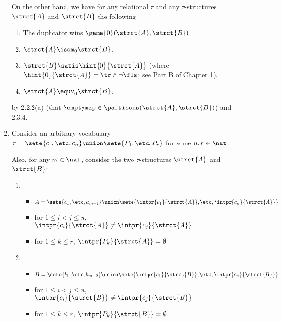 \begin{enumerate}[1.]
On the other hand, we have for any relational $\tau$ and any $\tau$-structures $\strct{A}$ and $\strct{B}$ the following
\begin{enumerate}[(1)]
\item The duplicator wins $\game{0}(\strct{A}, \strct{B})$.
\item $\strct{A} \isom_0 \strct{B}$.
\item $\strct{B} \satis \hint{0}{\strct{A}}$ (where $\hint{0}{\strct{A}} = \tr \land \neg\fls$; see Part B of Chapter 1).
\item $\strct{A} \equv_0 \strct{B}$.
\end{enumerate}
by 2.2.2(a) (that $\emptymap \in \partisoms(\strct{A}, \strct{B})$) and 2.3.4.
%
\item {} Consider an arbitrary vocabulary $\tau = \sete{c_1, \etc, c_n} \union \sete{P_1, \etc, P_r}$ for some $n, r \in \nat$.

Also, for any $m \in \nat$, consider the two $\tau$-structures $\strct{A}$ and $\strct{B}$:
\begin{enumerate}[(1)]
\item \begin{itemize}
\item $A = \sete{a_1, \etc, a_{m + 1}} \union \sete{\intpr{c_1}{\strct{A}}, \etc, \intpr{c_n}{\strct{A}}}$
\item for $1 \leq i < j \leq n$, $\intpr{c_i}{\strct{A}} \neq \intpr{c_j}{\strct{A}}$
\item for $1 \leq k \leq r$, $\intpr{P_k}{\strct{A}} = \emptyset$
\end{itemize}
\item \begin{itemize}
\item $B = \sete{b_1, \etc, b_{m + 2}} \union \sete{\intpr{c_1}{\strct{B}}, \etc, \intpr{c_n}{\strct{B}}}$
\item for $1 \leq i < j \leq n$, $\intpr{c_i}{\strct{B}} \neq \intpr{c_j}{\strct{B}}$
\item for $1 \leq k \leq r$, $\intpr{P_k}{\strct{B}} = \emptyset$
\end{itemize}
\end{enumerate}


\end{enumerate}
